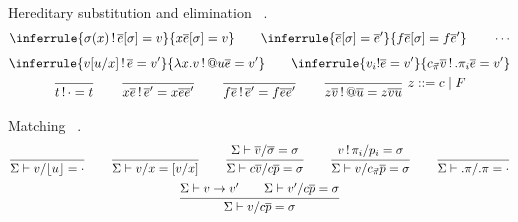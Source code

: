 \documentclass[acmlarge]{acmart}\settopmatter{}
\renewcommand{\|}{\mid}
\begin{document}
Hereditary substitution 
and elimination \ .
\begin{gather*}
\inferrule
  {\sigma(x) \bang \overline{e}[\sigma] = v}
  {x \overline{e}[\sigma] = v}
\qquad
\inferrule
  {\overline{e}[\sigma] = \overline{e}'}
  {f \overline{e}[\sigma] = f \overline{e}'}
\qquad
\cdots
\end{gather*}
\begin{gather*}
\inferrule
  { v[u/x] \bang \overline{e} = v'}
  {\lambda x.v \bang @u \overline{e} = v'}
\qquad
\inferrule
  {v_i ! \overline{e} = v'}
  {\cpi \overline{v} \bang .\pi_i \overline{e} = v'}
\\
\ru{}{t \bang \cdot = t}
\qquad
\ru{}{x \overline{e} \bang \overline{e}' = x \overline{e}
  \overline{e}'}
\qquad
\ru{}{f \overline{e} \bang \overline{e}' = f \overline{e} \overline{e}'}
\qquad
\ru{}{z \overline{v} \bang @ \overline{u} = z \overline{v}
  \overline{u}}\ z ::= c \mid F
\end{gather*}



Matching \ .
\begin{gather*}
\ru{}{\Sigma \vdash v/\lfloor u \rfloor = \cdot} %
\qquad
\ru{}{\Sigma \vdash v/x = [v/x]} %
\qquad
\ru
  {\Sigma \vdash \overline{v}/\overline{\sigma} = \sigma}
  {\Sigma \vdash c\overline{v}/c\overline{p} = \sigma}  %
\qquad
\ru{v \bang \pi_i / p_i = \sigma}
{\Sigma \vdash v / \cpi \overline{p} = \sigma} %
\qquad
\ru{}{\Sigma \vdash .\pi/.\pi = \cdot} %
\\
\ru{\Sigma \vdash v \to v' \qquad \Sigma \vdash v'/c\overline{p} = \sigma}
{\Sigma \vdash v / c \overline{p} = \sigma} %
\end{gather*}
\end{document}
